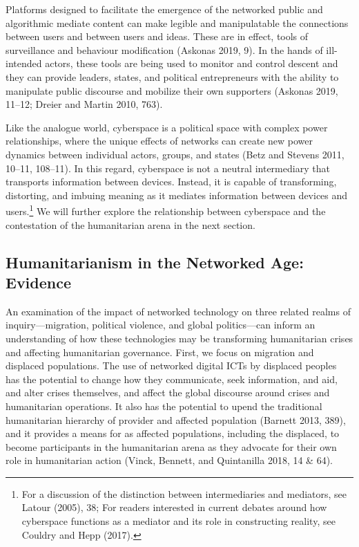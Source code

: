 \documentclass[
]{article}
\begin{document}
Platforms designed to facilitate the emergence of the networked public
and algorithmic mediate content can make legible and manipulatable the
connections between users and between users and ideas. These are in
effect, tools of surveillance and behaviour modification (Askonas 2019,
9). In the hands of ill-intended actors, these tools are being used to
monitor and control descent and they can provide leaders, states, and
political entrepreneurs with the ability to manipulate public discourse
and mobilize their own supporters (Askonas 2019, 11--12; Dreier and
Martin 2010, 763).

Like the analogue world, cyberspace is a political space with complex
power relationships, where the unique effects of networks can create new
power dynamics between individual actors, groups, and states (Betz and
Stevens 2011, 10--11, 108--11). In this regard, cyberspace is not a
neutral intermediary that transports information between devices.
Instead, it is capable of transforming, distorting, and imbuing meaning
as it mediates information between devices and users.\footnote{For a
  discussion of the distinction between intermediaries and mediators,
  see Latour (2005), 38; For readers interested in current debates
  around how cyberspace functions as a mediator and its role in
  constructing reality, see Couldry and Hepp (2017).} We will further
explore the relationship between cyberspace and the contestation of the
humanitarian arena in the next section.

\hypertarget{humanitarianism-in-the-networked-age-evidence}{%
\subsection{Humanitarianism in the Networked Age:
Evidence}\label{humanitarianism-in-the-networked-age-evidence}}

An examination of the impact of networked technology on three related
realms of inquiry---migration, political violence, and global
politics---can inform an understanding of how these technologies may be
transforming humanitarian crises and affecting humanitarian governance.
First, we focus on migration and displaced populations. The use of
networked digital ICTs by displaced peoples has the potential to change
how they communicate, seek information, and aid, and alter crises
themselves, and affect the global discourse around crises and
humanitarian operations. It also has the potential to upend the
traditional humanitarian hierarchy of provider and affected population
(Barnett 2013, 389), and it provides a means for as affected
populations, including the displaced, to become participants in the
humanitarian arena as they advocate for their own role in humanitarian
action (Vinck, Bennett, and Quintanilla 2018, 14 \& 64).
\end{document}
